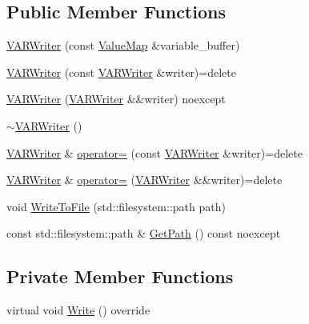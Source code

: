 \subsection*{Public Member Functions}
\begin{DoxyCompactItemize}
\item 
\mbox{\hyperlink{classmage_1_1loader_1_1_v_a_r_writer_a1b08fd8f57b0822550851bcb7f380cdb}{V\+A\+R\+Writer}} (const \mbox{\hyperlink{namespacemage_a3a4b59e486babe3ec78455f9ee0d4beb}{Value\+Map}} \&variable\+\_\+buffer)
\item 
\mbox{\hyperlink{classmage_1_1loader_1_1_v_a_r_writer_a5ddb3fcd75952ecc8593bc284dc3db0e}{V\+A\+R\+Writer}} (const \mbox{\hyperlink{classmage_1_1loader_1_1_v_a_r_writer}{V\+A\+R\+Writer}} \&writer)=delete
\item 
\mbox{\hyperlink{classmage_1_1loader_1_1_v_a_r_writer_ab8a676252c909a6f8914d786048de255}{V\+A\+R\+Writer}} (\mbox{\hyperlink{classmage_1_1loader_1_1_v_a_r_writer}{V\+A\+R\+Writer}} \&\&writer) noexcept
\item 
\mbox{\hyperlink{classmage_1_1loader_1_1_v_a_r_writer_af908fe01c6754dabec6ed3c45b852b3b}{$\sim$\+V\+A\+R\+Writer}} ()
\item 
\mbox{\hyperlink{classmage_1_1loader_1_1_v_a_r_writer}{V\+A\+R\+Writer}} \& \mbox{\hyperlink{classmage_1_1loader_1_1_v_a_r_writer_a6ffe21455dfc82f8d829d9cabe59ba53}{operator=}} (const \mbox{\hyperlink{classmage_1_1loader_1_1_v_a_r_writer}{V\+A\+R\+Writer}} \&writer)=delete
\item 
\mbox{\hyperlink{classmage_1_1loader_1_1_v_a_r_writer}{V\+A\+R\+Writer}} \& \mbox{\hyperlink{classmage_1_1loader_1_1_v_a_r_writer_aef0efc3b6d9ca8c0da5e45063da01365}{operator=}} (\mbox{\hyperlink{classmage_1_1loader_1_1_v_a_r_writer}{V\+A\+R\+Writer}} \&\&writer)=delete
\item 
void \mbox{\hyperlink{classmage_1_1loader_1_1_v_a_r_writer_ac01e930b55888da88e345b0910d4b1c2}{Write\+To\+File}} (std\+::filesystem\+::path path)
\item 
const std\+::filesystem\+::path \& \mbox{\hyperlink{classmage_1_1loader_1_1_v_a_r_writer_ab023ae8174132f233c6e1fa4d3a2a1c8}{Get\+Path}} () const noexcept
\end{DoxyCompactItemize}
\subsection*{Private Member Functions}
\begin{DoxyCompactItemize}
\item 
virtual void \mbox{\hyperlink{classmage_1_1loader_1_1_v_a_r_writer_af2bbf94353f1b4b01aa56e8dd9c89d7f}{Write}} () override
\end{DoxyCompactItemize}
